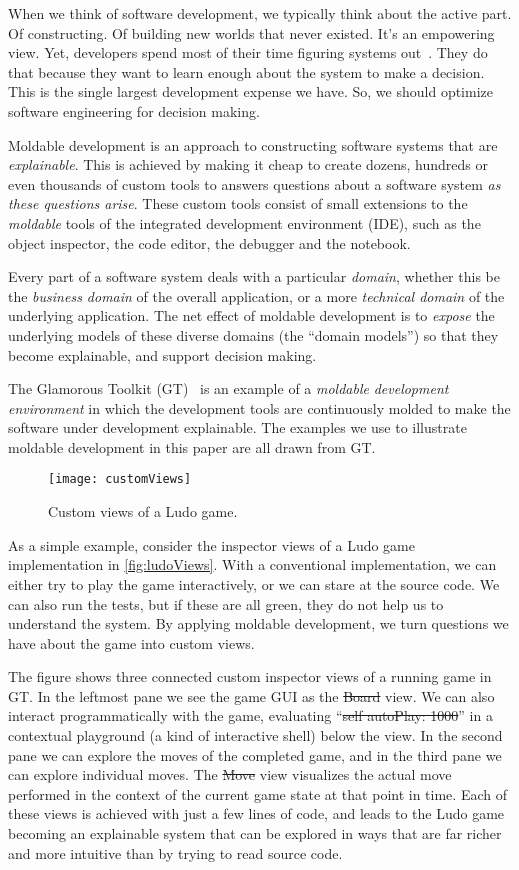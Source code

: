 \documentclass[sigconf]{acmart}
\begin{document}
When we think of software development, we typically think about the active part.
Of constructing.
Of building new worlds that never existed.
It's an empowering view.
Yet, developers spend most of their time figuring systems out~\cite{Zelk79b}.
They do that because they want to learn enough about the system to make a decision.
This is the single largest development expense we have.
So, we should optimize software engineering for decision making.

Moldable development is an approach to constructing software systems that are \emph{explainable}.
This is achieved by making it cheap to create dozens, hundreds or even thousands of custom tools to answers questions about a software system \emph{as these questions arise}.
These custom tools consist of small extensions to the \emph{moldable} tools of the integrated development environment (IDE), such as the object inspector, the code editor, the debugger and the notebook.

Every part of a software system deals with a particular \emph{domain}, whether this be the \emph{business domain} of the overall application, or a more \emph{technical domain}  of the underlying application.
The net effect of moldable development is to \emph{expose} the underlying models of these diverse domains (\ie the ``domain models'') so that they become explainable, and support decision making.

The Glamorous Toolkit (GT)~\cite{feenk23a} is an example of a \emph{moldable} \emph{development} \emph{environment} in which the development tools are continuously molded to make the software under development explainable.
The examples we use to illustrate moldable development in this paper are all drawn from GT.

\begin{figure}[h]
  \texttt{[image: customViews]}
  \caption{Custom views of a Ludo game.}
  \label{fig:ludoViews}
\end{figure}

As a simple example, consider the inspector views of a Ludo game implementation in \autoref{fig:ludoViews}.
With a conventional implementation, we can either try to play the game interactively, or we can stare at the source code.
We can also run the tests, but if these are all green, they do not help us to understand the system.
By applying moldable development, we turn questions we have about the game into custom views.

The figure shows three connected custom inspector views of a running game in GT.
In the leftmost pane we see the game GUI as the \st{Board} view.
We can also interact programmatically with the game, evaluating ``\st{self autoPlay: 1000}'' in a contextual playground (a kind of interactive shell) below the view.
In the second pane we can explore the moves of  the completed game, and in the third pane we can explore individual moves.
The \st{Move} view visualizes the actual move performed in the context of the current game state at that point in time.
Each of these views is achieved with just a few lines of code, and leads to the Ludo game becoming an explainable system that can be explored in ways that are far richer and more intuitive than by trying to read source code.
\end{document}
